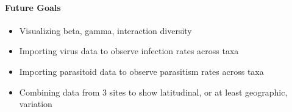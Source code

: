 \documentclass[
]{article}
\providecommand{\tightlist}{%
  \setlength{\itemsep}{0pt}\setlength{\parskip}{0pt}}
\begin{document}
\hypertarget{future-goals-1}{%
\paragraph{Future Goals}\label{future-goals-1}}

\begin{itemize}
\tightlist
\item
  Visualizing beta, gamma, interaction diversity\\
\item
  Importing virus data to observe infection rates across taxa
\item
  Importing parasitoid data to observe parasitism rates across taxa
\item
  Combining data from 3 sites to show latitudinal, or at least
  geographic, variation
\end{itemize}
\end{document}
